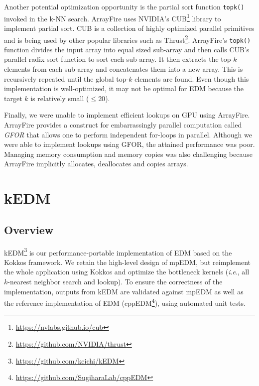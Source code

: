 \documentclass{acmart}
\begin{document}
Another potential optimization opportunity is the partial sort function
\texttt{topk()} invoked in the k-NN search. ArrayFire uses NVIDIA's
CUB\footnote{\url{https://nvlabs.github.io/cub}} library to implement partial
sort. CUB is a collection of highly optimized parallel primitives and is being
used by other popular libraries such
as Thrust\footnote{\url{https://github.com/NVIDIA/thrust}}. ArrayFire's
\texttt{topk()} function divides the input array into equal sized sub-array
and then calls CUB's parallel radix sort function to sort each sub-array. It
then extracts the top-$k$ elements from each sub-array and concatenates them
into a new array. This is recursively repeated until the global top-$k$
elements are found. Even though this implementation is well-optimized, it may
not be optimal for EDM because the target $k$ is relatively small ($\leq 20$).

Finally, we were unable to implement efficient lookups on GPU using ArrayFire.
ArrayFire provides a construct for embarrassingly parallel computation called
\textit{GFOR} that allows one to perform independent for-loops in parallel.
Although we were able to implement lookups using GFOR, the attained
performance was poor. Managing memory consumption and memory copies was also
challenging because ArrayFire implicitly allocates, deallocates and copies
arrays.

\section{kEDM}\label{sec:proposal}


\subsection{Overview}

kEDM\footnote{\url{https://github.com/keichi/kEDM}} is our
performance-portable implementation of EDM based on the Kokkos framework. We retain the high-level design of mpEDM, but
reimplement the whole application using Kokkos and optimize the bottleneck kernels
(\textit{i}.\textit{e}., all $k$-nearest neighbor search and lookup). To ensure the correctness of the
implementation, outputs from kEDM are validated against mpEDM as well as
the reference implementation of EDM
(cppEDM\footnote{\url{https://github.com/SugiharaLab/cppEDM}}), using automated unit tests.
\end{document}
